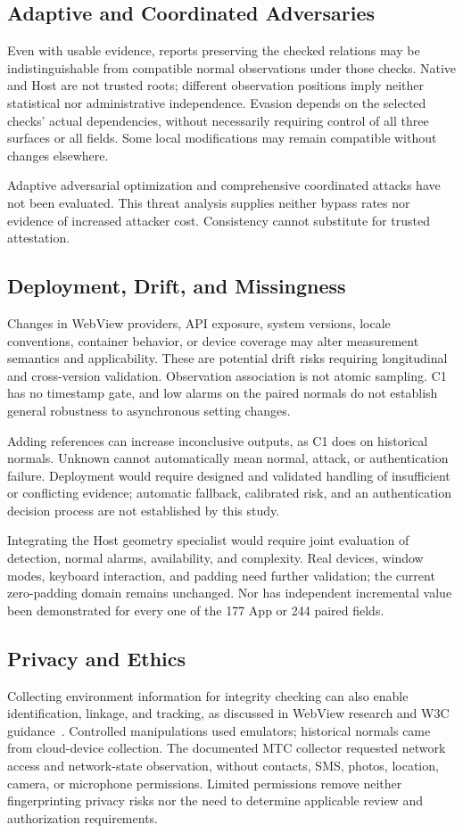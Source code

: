 \subsection{Adaptive and Coordinated Adversaries}
Even with usable evidence, reports preserving the checked relations may be indistinguishable from compatible normal observations under those checks. Native and Host are not trusted roots; different observation positions imply neither statistical nor administrative independence. Evasion depends on the selected checks' actual dependencies, without necessarily requiring control of all three surfaces or all fields. Some local modifications may remain compatible without changes elsewhere.

Adaptive adversarial optimization and comprehensive coordinated attacks have not been evaluated. This threat analysis supplies neither bypass rates nor evidence of increased attacker cost. Consistency cannot substitute for trusted attestation.

\subsection{Deployment, Drift, and Missingness}
Changes in WebView providers, API exposure, system versions, locale conventions, container behavior, or device coverage may alter measurement semantics and applicability. These are potential drift risks requiring longitudinal and cross-version validation. Observation association is not atomic sampling. C1 has no timestamp gate, and low alarms on the paired normals do not establish general robustness to asynchronous setting changes.

Adding references can increase inconclusive outputs, as C1 does on historical normals. Unknown cannot automatically mean normal, attack, or authentication failure. Deployment would require designed and validated handling of insufficient or conflicting evidence; automatic fallback, calibrated risk, and an authentication decision process are not established by this study.

Integrating the Host geometry specialist would require joint evaluation of detection, normal alarms, availability, and complexity. Real devices, window modes, keyboard interaction, and padding need further validation; the current zero-padding domain remains unchanged. Nor has independent incremental value been demonstrated for every one of the 177 App or 244 paired fields.

\subsection{Privacy and Ethics}
Collecting environment information for integrity checking can also enable identification, linkage, and tracking, as discussed in WebView research and W3C guidance~\cite{weerasekara2025tracking,w3c2025fingerprinting}. Controlled manipulations used emulators; historical normals came from cloud-device collection. The documented MTC collector requested network access and network-state observation, without contacts, SMS, photos, location, camera, or microphone permissions. Limited permissions remove neither fingerprinting privacy risks nor the need to determine applicable review and authorization requirements.

